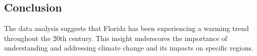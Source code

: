 \documentclass[a4paper,12pt,]{article}
\begin{document}
\begin{spacing}{1.0}
\section{Conclusion}
The data analysis suggests that Florida has been experiencing a warming trend throughout the 20th century. This insight underscores the importance of understanding and addressing climate change and its impacts on specific regions.

\end{spacing}
\end{document}
